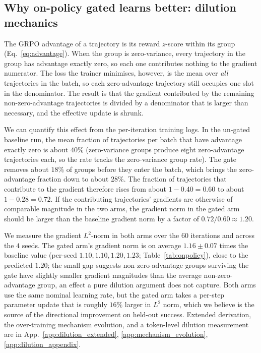 \documentclass{article}
\begin{document}
\subsection{Why on-policy gated learns better: dilution mechanics}
\label{sec:dilution}

The GRPO advantage of a trajectory is its reward $z$-score
within its group (Eq.~\ref{eq:advantage}). When the group is
zero-variance, every trajectory in the group has advantage
exactly zero, so each one contributes nothing to the gradient
numerator. The loss the trainer minimises, however, is the mean
over \emph{all} trajectories in the batch, so each
zero-advantage trajectory still occupies one slot in the
denominator. The result is that the gradient contributed by the
remaining non-zero-advantage trajectories is divided by a
denominator that is larger than necessary, and the effective
update is shrunk.

We can quantify this effect from the per-iteration training logs.
In the un-gated baseline run, the mean fraction of trajectories
per batch that have advantage exactly zero is about $40\%$
(zero-variance groups produce eight zero-advantage trajectories
each, so the rate tracks the zero-variance group rate). The gate
removes about $18\%$ of groups before they enter the batch,
which brings the zero-advantage fraction down to about $28\%$.
The fraction of trajectories that contribute to the gradient
therefore rises from about $1 - 0.40 = 0.60$ to about
$1 - 0.28 = 0.72$. If the contributing trajectories' gradients
are otherwise of comparable magnitude in the two arms, the
gradient norm in the gated arm should be larger than the
baseline gradient norm by a factor of $0.72 / 0.60 \approx 1.20$.

We measure the gradient $L^2$-norm in both arms over the $60$
iterations and across the $4$ seeds. The gated arm's gradient
norm is on average $1.16 \pm 0.07$ times the baseline value
(per-seed $1.10, 1.10, 1.20, 1.23$; Table~\ref{tab:onpolicy}),
close to the predicted $1.20$; the small gap suggests
non-zero-advantage groups surviving the gate have slightly
smaller gradient magnitudes than the average non-zero-advantage
group, an effect a pure dilution argument does not capture. Both
arms use the same nominal learning rate, but the gated arm takes
a per-step parameter update that is roughly $16\%$ larger in
$L^2$ norm, which we believe is the source of the directional
improvement on held-out success. Extended derivation, the
over-training mechanism evolution, and a token-level dilution
measurement are in App.~\ref{app:dilution_extended},
\ref{app:mechanism_evolution}, \ref{app:dilution_appendix}.
\end{document}
